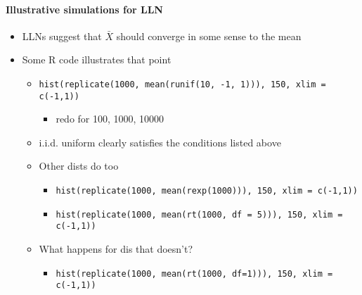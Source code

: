 \paragraph{Illustrative simulations for LLN}
\begin{itemize}
\item LLNs suggest that $\bar X$ should converge in some sense to the mean
\item Some R code illustrates that point
\begin{itemize}
\item \texttt{hist(replicate(1000, mean(runif(10, -1, 1))), 150, xlim = c(-1,1))}
\begin{itemize}
\item redo for 100, 1000, 10000
\end{itemize}
\item i.i.d. uniform clearly satisfies the conditions listed above
\item Other dists do too
\begin{itemize}
\item \texttt{hist(replicate(1000, mean(rexp(1000))), 150, xlim = c(-1,1))}
\item \texttt{hist(replicate(1000, mean(rt(1000, df = 5))), 150, xlim = c(-1,1))}
\end{itemize}
\item What happens for dis that doesn't?
\begin{itemize}
\item \texttt{hist(replicate(1000, mean(rt(1000, df=1))), 150, xlim = c(-1,1))}
\end{itemize}
\end{itemize}
\end{itemize}

